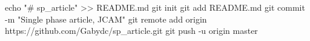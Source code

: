 echo "# sp_article" >> README.md
git init
git add README.md
git commit -m "Single phase article, JCAM"
git remote add origin https://github.com/Gabydc/sp_article.git
git push -u origin master
